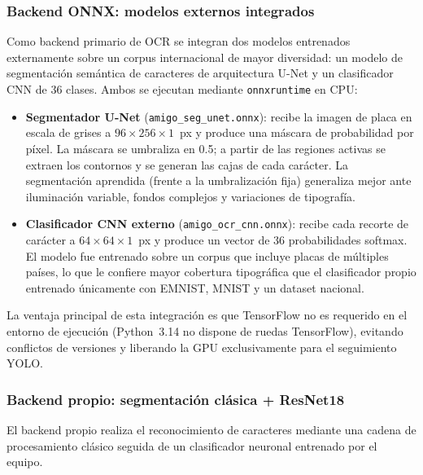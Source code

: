 \documentclass[11pt]{article}
\begin{document}
\subsubsection{Backend ONNX: modelos externos integrados}
\label{sec:onnx}

Como backend primario de OCR se integran dos modelos entrenados externamente sobre un
corpus internacional de mayor diversidad: un modelo de segmentación semántica de
caracteres de arquitectura U-Net \cite{unet} y un clasificador CNN de 36 clases.
Ambos se ejecutan mediante \texttt{onnxruntime} \cite{onnxruntime} en CPU:

\begin{itemize}
    \item \textbf{Segmentador U-Net} (\texttt{amigo\_seg\_unet.onnx}): recibe la
    imagen de placa en escala de grises a $96\times256\times1$~px y produce una
    máscara de probabilidad por píxel. La máscara se umbraliza en 0.5; a partir de
    las regiones activas se extraen los contornos y se generan las cajas de cada
    carácter. La segmentación aprendida (frente a la umbralización fija) generaliza
    mejor ante iluminación variable, fondos complejos y variaciones de tipografía.
    \item \textbf{Clasificador CNN externo} (\texttt{amigo\_ocr\_cnn.onnx}): recibe
    cada recorte de carácter a $64\times64\times1$~px y produce un vector de 36
    probabilidades softmax. El modelo fue entrenado sobre un corpus que incluye placas
    de múltiples países, lo que le confiere mayor cobertura tipográfica que el
    clasificador propio entrenado únicamente con EMNIST, MNIST y un dataset nacional.
\end{itemize}

La ventaja principal de esta integración es que TensorFlow no es requerido en el
entorno de ejecución (Python~3.14 no dispone de ruedas TensorFlow), evitando
conflictos de versiones y liberando la GPU exclusivamente para el seguimiento YOLO.

\subsubsection{Backend propio: segmentación clásica + ResNet18}
\label{sec:cnn_propia}

El backend propio realiza el reconocimiento de caracteres mediante una cadena de
procesamiento clásico seguida de un clasificador neuronal entrenado por el equipo.
\end{document}
